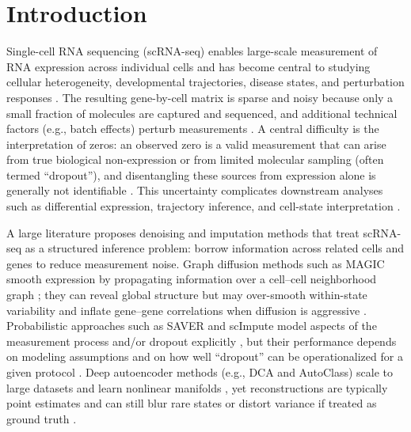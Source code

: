 \documentclass{article}
\theoremstyle{plain}
\theoremstyle{definition}
\theoremstyle{remark}
\begin{document}
\section{Introduction}
Single-cell RNA sequencing (scRNA-seq) enables large-scale measurement of RNA expression across individual cells and has become central to studying cellular heterogeneity, developmental trajectories, disease states, and perturbation responses \citep{Luecken2019BestPractices, Hicks2018MissingData, VanDeSande2023DrugDiscovery}. The resulting gene-by-cell matrix is sparse and noisy because only a small fraction of molecules are captured and sequenced, and additional technical factors (e.g., batch effects) perturb measurements \citep{Brennecke2013TechnicalNoise, Hicks2018MissingData}. A central difficulty is the interpretation of zeros: an observed zero is a valid measurement that can arise from true biological non-expression or from limited molecular sampling (often termed ``dropout''), and disentangling these sources from expression alone is generally not identifiable \citep{SarkarStephens2021SeparatingMeasurement, Svensson2020NotZeroInflated, Jiang2022ZeroInflationReview, Linderman2022ZeroPreserving}. This uncertainty complicates downstream analyses such as differential expression, trajectory inference, and cell-state interpretation \citep{Hou2020ImputationBenchmark, Luecken2019BestPractices}.

A large literature proposes denoising and imputation methods that treat scRNA-seq as a structured inference problem: borrow information across related cells and genes to reduce measurement noise. Graph diffusion methods such as MAGIC smooth expression by propagating information over a cell--cell neighborhood graph \citep{vanDijk2018MAGIC}; they can reveal global structure but may over-smooth within-state variability and inflate gene--gene correlations when diffusion is aggressive \citep{Huang2018SAVER, Hou2020ImputationBenchmark}. Probabilistic approaches such as SAVER and scImpute model aspects of the measurement process and/or dropout explicitly \citep{Huang2018SAVER, Li2018scImpute}, but their performance depends on modeling assumptions and on how well ``dropout'' can be operationalized for a given protocol \citep{Svensson2020NotZeroInflated, Jiang2022ZeroInflationReview}. Deep autoencoder methods (e.g., DCA and AutoClass) scale to large datasets and learn nonlinear manifolds \citep{Eraslan2019DCA, Li2022AutoClass}, yet reconstructions are typically point estimates and can still blur rare states or distort variance if treated as ground truth \citep{Hou2020ImputationBenchmark, Linderman2022ZeroPreserving}.
\end{document}

